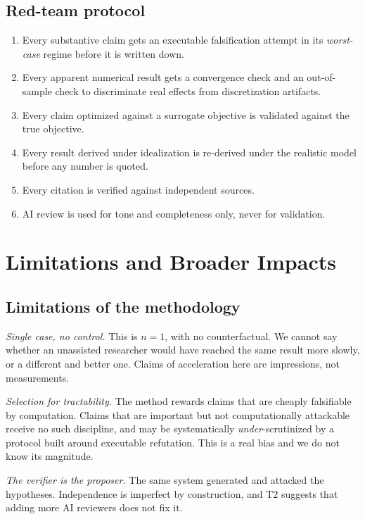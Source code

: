 \documentclass[11pt]{article}
\theoremstyle{remark}
\begin{document}
\subsection{Red-team protocol}
\begin{enumerate}
\item Every substantive claim gets an executable falsification attempt in its \emph{worst-case} regime before it is written down.
\item Every apparent numerical result gets a convergence check and an out-of-sample check to discriminate real effects from discretization artifacts.
\item Every claim optimized against a surrogate objective is validated against the true objective.
\item Every result derived under idealization is re-derived under the realistic model before any number is quoted.
\item Every citation is verified against independent sources.
\item AI review is used for tone and completeness only, never for validation.
\end{enumerate}

\section{Limitations and Broader Impacts}
\label{sec:limitations}

\subsection{Limitations of the methodology}
\emph{Single case, no control.} This is $n=1$, with no counterfactual. We cannot say whether an unassisted researcher would have reached the same result more slowly, or a different and better one. Claims of acceleration here are impressions, not measurements.

\emph{Selection for tractability.} The method rewards claims that are cheaply falsifiable by computation. Claims that are important but not computationally attackable receive no such discipline, and may be systematically \emph{under}-scrutinized by a protocol built around executable refutation. This is a real bias and we do not know its magnitude.

\emph{The verifier is the proposer.} The same system generated and attacked the hypotheses. Independence is imperfect by construction, and T2 suggests that adding more AI reviewers does not fix it.
\end{document}

